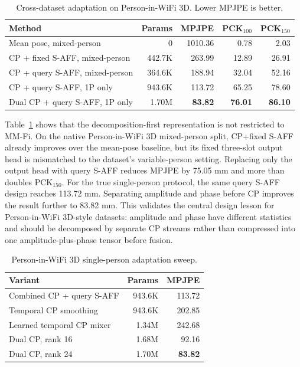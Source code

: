 \documentclass[10pt,conference]{IEEEtran}
\begin{document}
\begin{table}[t]
\centering
\caption{Cross-dataset adaptation on Person-in-WiFi 3D. Lower MPJPE is better.}
\label{tab:piw3d}
\begin{tabular}{lrrrr}
\toprule
Method & Params & MPJPE & PCK$_{100}$ & PCK$_{150}$ \\
\midrule
Mean pose, mixed-person & 0 & 1010.36 & 0.78 & 2.03 \\
CP + fixed S-AFF, mixed-person & 442.7K & 263.99 & 12.89 & 26.91 \\
CP + query S-AFF, mixed-person & 364.6K & 188.94 & 32.04 & 52.16 \\
CP + query S-AFF, 1P only & 943.6K & 113.72 & 65.25 & 78.60 \\
Dual CP + query S-AFF, 1P only & 1.70M & \textbf{83.82} & \textbf{76.01} & \textbf{86.10} \\
\bottomrule
\end{tabular}
\end{table}

Table~\ref{tab:piw3d} shows that the decomposition-first representation is not restricted to MM-Fi. On the native Person-in-WiFi 3D mixed-person split, CP+fixed S-AFF already improves over the mean-pose baseline, but its fixed three-slot output head is mismatched to the dataset's variable-person setting. Replacing only the output head with query S-AFF reduces MPJPE by 75.05 mm and more than doubles PCK$_{150}$. For the true single-person protocol, the same query S-AFF design reaches 113.72 mm. Separating amplitude and phase before CP improves the result further to 83.82 mm. This validates the central design lesson for Person-in-WiFi 3D-style datasets: amplitude and phase have different statistics and should be decomposed by separate CP streams rather than compressed into one amplitude-plus-phase tensor before fusion.

\begin{table}[t]
\centering
\caption{Person-in-WiFi 3D single-person adaptation sweep.}
\label{tab:piw3d_sweep}
\begin{tabular}{lrr}
\toprule
Variant & Params & MPJPE \\
\midrule
Combined CP + query S-AFF & 943.6K & 113.72 \\
Temporal CP smoothing & 943.6K & 202.85 \\
Learned temporal CP mixer & 1.34M & 242.68 \\
Dual CP, rank 16 & 1.68M & 92.16 \\
Dual CP, rank 24 & 1.70M & \textbf{83.82} \\
\bottomrule
\end{tabular}
\end{table}
\end{document}
